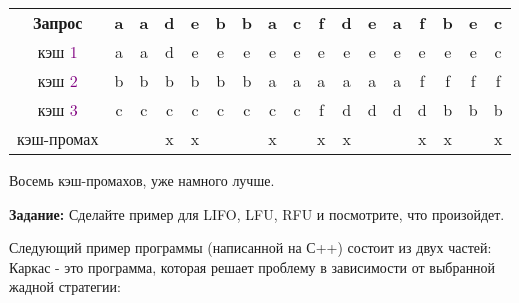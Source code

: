 \begin{tabular}{*{17}{c}}
\textbf{Запрос} & \textbf{a} & \textbf{a} & \textbf{d} & \textbf{e} & \textbf{b} & \textbf{b} & \textbf{a} & \textbf{c} & \textbf{f} & \textbf{d} & \textbf{e} & \textbf{a} & \textbf{f} & \textbf{b} & \textbf{e} & \textbf{c}\\
кэш \textcolor{Purple}{1} & a & a & d & e & e & e & e & e & e & e & e & e & e & e & e & c \\
кэш \textcolor{Purple}{2} & b & b & b & b & b & b & a & a & a & a & a & a & f & f & f & f \\
кэш \textcolor{Purple}{3} & c & c & c & c & c & c & c & c & f & d & d & d & d & b & b & b \\
кэш-промах & \ & \ & x & x & \ & \ & x & \ & x & x & \ & \ & x & x & \ & x \\
\end{tabular}
\setlength{\tabcolsep}{6pt}

\vspace{\baselineskip}

Восемь кэш-промахов, уже намного лучше.

\vspace{\baselineskip}

\textbf{Задание:} Сделайте пример для LIFO, LFU, RFU и посмотрите, что произойдет.

\vspace{\baselineskip}

Следующий пример программы (написанной на С++) состоит из двух частей:
Каркас - это программа, которая решает проблему в зависимости от выбранной жадной стратегии:


